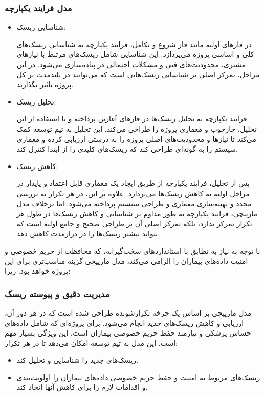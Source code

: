 \subsubsection*{مدل فرایند یکپارچه}
\begin{itemize}
    \item شناسایی ریسک:
    
    در فازهای اولیه مانند فاز شروع و تکامل، فرایند یکپارچه به شناسایی ریسک‌های کلی و اساسی پروژه می‌پردازد. این شناسایی شامل ریسک‌های مرتبط با نیازهای مشتری، محدودیت‌های فنی و مشکلات احتمالی در پیاده‌سازی می‌شود. در این مراحل، تمرکز اصلی بر شناسایی ریسک‌هایی است که می‌توانند در بلندمدت بر کل پروژه تاثیر بگذارند.
    \item تحلیل ریسک:
    
    فرایند یکپارچه به تحلیل ریسک‌ها در فازهای آغازین پرداخته و با استفاده از این تحلیل، چارچوب و معماری پروژه را طراحی می‌کند. این تحلیل به تیم توسعه کمک می‌کند تا نیازها و محدودیت‌های اصلی پروژه را به درستی ارزیابی کرده و معماری سیستم را به گونه‌ای طراحی کند که ریسک‌های کلیدی را از ابتدا کنترل کند.
    \item کاهش ریسک:
    
    پس از تحلیل، فرایند یکپارچه از طریق ایجاد یک معماری قابل اعتماد و پایدار در مراحل اولیه به کاهش ریسک‌ها می‌پردازد. علاوه بر این، در هر تکرار به بررسی مجدد و بهینه‌سازی معماری و طراحی سیستم پرداخته می‌شود. اما برخلاف مدل مارپیچی، فرایند یکپارچه به طور مداوم بر شناسایی و کاهش ریسک‌ها در طول هر تکرار تمرکز ندارد، بلکه تمرکز اصلی آن بر طراحی صحیح و جامع اولیه است که بتواند بیشتر ریسک‌ها را در درازمدت کاهش دهد.
\end{itemize}

با توجه به نیاز به تطابق با استانداردهای سخت‌گیرانه، که محافظت از حریم خصوصی و امنیت داده‌های بیماران را الزامی می‌کند، مدل مارپیچی گزینه مناسب‌تری برای این پروژه خواهد بود. زیرا:

\subsubsection*{مدیریت دقیق و پیوسته ریسک}
مدل مارپیچی بر اساس یک چرخه تکرارشونده طراحی شده است که در هر دور آن، ارزیابی و کاهش ریسک‌های جدید انجام می‌شود. برای پروژه‌ای که شامل داده‌های حساس پزشکی و نیازمند حفظ حریم خصوصی بیماران است، این ویژگی بسیار مهم است. این مدل به تیم توسعه امکان می‌دهد تا در هر تکرار:

\begin{itemize}
    \item ریسک‌های جدید را شناسایی و تحلیل کند.
    \item ریسک‌های مربوط به امنیت و حفظ حریم خصوصی داده‌های بیماران را اولویت‌بندی و اقدامات لازم را برای کاهش آنها اتخاذ کند.
\end{itemize}

